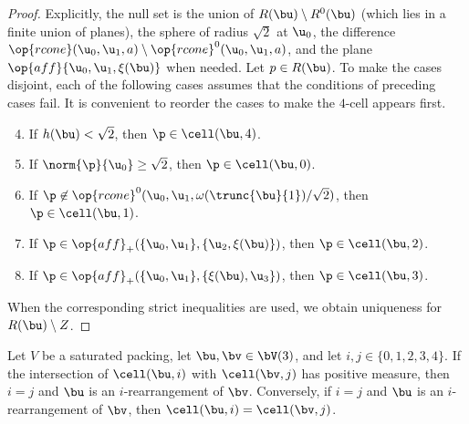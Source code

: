 \begin{proof} 
Explicitly, the null set is the union of $R(\bu)\setminus R^0(\bu)$ (which lies in 
a finite union of planes), the sphere of radius $\sqrt2$ at $\u_0$, 
the difference $\op{rcone}(\u_0,\u_1,a)\setminus \op{rcone}^0(\u_0,\u_1,a)$,
and the
plane $\op{aff}\{\u_0,\u_1,\xi(\bu)\}$ when needed.  Let $p\in R(\bu)$.
To make the cases disjoint, each of the following cases assumes that  the conditions of preceding cases fail.  It is convenient to reorder the cases to make the $4$-cell appears first.
\begin{enumerate}
\setcounter{enumi}{3}
\item %
If $h(\bu)<\sqrt2$,  then $\p\in\cell(\bu,4)$.

\setcounter{enumi}{-1}
\item %
If $\norm{\p}{\u_0} \ge\sqrt2$,  then $\p\in\cell(\bu,0)$.

\item
If $\p\not\in\op{rcone}^0(\u_0,\u_1,\omega(\trunc{\bu}{1})/\sqrt2)$, then
 $\p\in \cell(\bu,1)$.

\item
If $\p\in \op{aff}_+(\{\u_0,\u_1\},\{\u_2,\xi(\bu)\})$, then
 $\p\in \cell(\bu,2)$.

\item
If $\p\in \op{aff}_+(\{\u_0,\u_1\},\{\xi(\bu),\u_3\})$, then $\p\in \cell(\bu,3)$.
\end{enumerate}
When the corresponding strict inequalities are used, we obtain uniqueness for
$R(\bu)\setminus Z$.
\end{proof}




\begin{lemma}[]\label{lemma:marchal-equal} 
Let $V$ be a saturated packing, 
let $\bu,\bv\in \bV(3)$, and let $i,j\in \{0,1,2,3,4\}$.
If the intersection of
$\cell(\bu,i)$ with $\cell(\bv,j)$ has positive measure,
then $i=j$ and $\bu$ is an $i$-rearrangement of $\bv$.
Conversely, if $i=j$ and $\bu$ is an $i$-rearrangement of $\bv$, 
then $\cell(\bu,i)=\cell(\bv,j)$.
\end{lemma}

